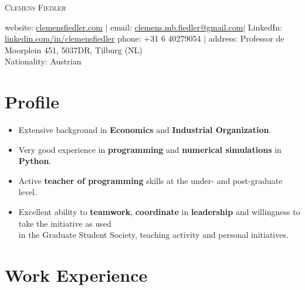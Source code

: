 \documentclass[a4paper,8pt]{article}
\begin{document}
\thispagestyle{empty}




\textsc{\Huge Clemens Fiedler}

website: \href{https://clemensfiedler.com/}{clemensfiedler.com} $\vert$ 
email: \href{mailto:clemens.mb.fiedler@gmail.com}{clemens.mb.fiedler@gmail.com}$\vert$ 
LinkedIn: \href{www.linkedin.com/in/clemensfiedler}{linkedin.com/in/clemensfiedler}
phone: +31 6 40279054 $\vert$ address: Professor de Moorplein 451, 5037DR, Tilburg (NL)\\
Nationality: Austrian

\section{Profile}

\begin{itemize}[noitemsep]
	\item Extensive background in \textbf{Economics} and \textbf{Industrial Organization}.
	\item Very good experience in \textbf{programming} and \textbf{numerical simulations} in \textbf{Python}.
	\item Active \textbf{teacher of programming} skills at the under- and post-graduate level.
	\item Excellent ability to \textbf{teamwork}, \textbf{coordinate} in \textbf{leadership} and willingness to take the initiative as used\\ in the Graduate Student Society, teaching activity and personal initiatives.
\end{itemize}

\section{Work Experience}
\end{document}
